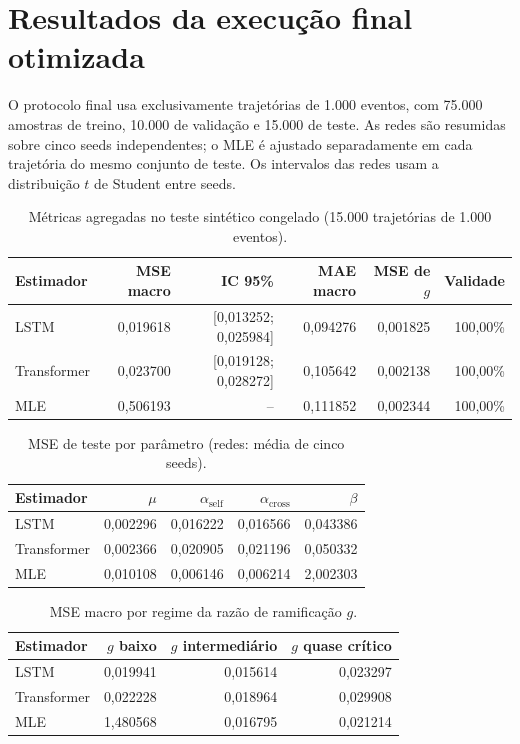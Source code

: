 \section*{Resultados da execução final otimizada}

O protocolo final usa exclusivamente trajetórias de 1.000 eventos, com
75.000 amostras de treino, 10.000 de validação e 15.000 de teste.
As redes são resumidas sobre cinco seeds independentes; o MLE é ajustado
separadamente em cada trajetória do mesmo conjunto de teste.
Os intervalos das redes usam a distribuição $t$ de Student entre seeds.

\begin{table}[htbp]
\centering
\caption{Métricas agregadas no teste sintético congelado (15.000 trajetórias de 1.000 eventos).}
\label{tab:final-agregado}
\small
\begin{tabular}{lrrrrr}
\toprule
Estimador & MSE macro & IC 95\% & MAE macro & MSE de $g$ & Validade\\
\midrule
LSTM & 0,019618 & [0,013252; 0,025984] & 0,094276 & 0,001825 & 100,00\%\\
Transformer & 0,023700 & [0,019128; 0,028272] & 0,105642 & 0,002138 & 100,00\%\\
MLE & 0,506193 & -- & 0,111852 & 0,002344 & 100,00\%\\
\bottomrule
\end{tabular}
\end{table}

\begin{table}[htbp]
\centering
\caption{MSE de teste por parâmetro (redes: média de cinco seeds).}
\label{tab:final-parametros}
\begin{tabular}{lrrrr}
\toprule
Estimador & $\mu$ & $\alpha_{\mathrm{self}}$ & $\alpha_{\mathrm{cross}}$ & $\beta$\\
\midrule
LSTM & 0,002296 & 0,016222 & 0,016566 & 0,043386\\
Transformer & 0,002366 & 0,020905 & 0,021196 & 0,050332\\
MLE & 0,010108 & 0,006146 & 0,006214 & 2,002303\\
\bottomrule
\end{tabular}
\end{table}

\begin{table}[htbp]
\centering
\caption{MSE macro por regime da razão de ramificação $g$.}
\label{tab:final-regimes}
\begin{tabular}{lrrr}
\toprule
Estimador & $g$ baixo & $g$ intermediário & $g$ quase crítico\\
\midrule
LSTM & 0,019941 & 0,015614 & 0,023297\\
Transformer & 0,022228 & 0,018964 & 0,029908\\
MLE & 1,480568 & 0,016795 & 0,021214\\
\bottomrule
\end{tabular}
\end{table}


